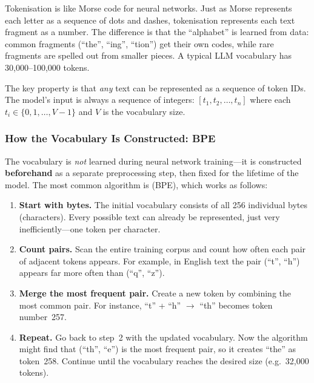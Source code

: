 \begin{analogy}
Tokenisation is like Morse code for neural networks. Just as Morse
represents each letter as a sequence of dots and dashes, tokenisation
represents each text fragment as a number. The difference is that the
``alphabet'' is learned from data: common fragments (``the'', ``ing'',
``tion'') get their own codes, while rare fragments are spelled out
from smaller pieces. A typical LLM vocabulary has 30{,}000--100{,}000
tokens.
\end{analogy}

The key property is that \emph{any} text can be represented as a
sequence of token IDs. The model's input is always a sequence of
integers: $[t_1, t_2, \ldots, t_n]$ where each $t_i \in
\{0, 1, \ldots, V{-}1\}$ and $V$ is the vocabulary size.

\subsubsection{How the Vocabulary Is Constructed: BPE}

The vocabulary is \emph{not} learned during neural network
training---it is constructed \textbf{beforehand} as a separate
preprocessing step, then fixed for the lifetime of the model.
The most common algorithm is  (BPE),
which works as follows:

\begin{enumerate}[leftmargin=2em]
  \item \textbf{Start with bytes.} The initial vocabulary consists of
    all 256 individual bytes (characters). Every possible text can
    already be represented, just very inefficiently---one token per
    character.

  \item \textbf{Count pairs.} Scan the entire training corpus and
    count how often each pair of adjacent tokens appears. For example,
    in English text the pair (``t'', ``h'') appears far more often
    than (``q'', ``z'').

  \item \textbf{Merge the most frequent pair.} Create a new token
    by combining the most common pair. For instance, ``t'' + ``h''
    $\to$ ``th'' becomes token number~257.

  \item \textbf{Repeat.} Go back to step~2 with the updated
    vocabulary. Now the algorithm might find that (``th'', ``e'') is
    the most frequent pair, so it creates ``the'' as token~258.
    Continue until the vocabulary reaches the desired size
    (e.g.\ 32{,}000 tokens).
\end{enumerate}

